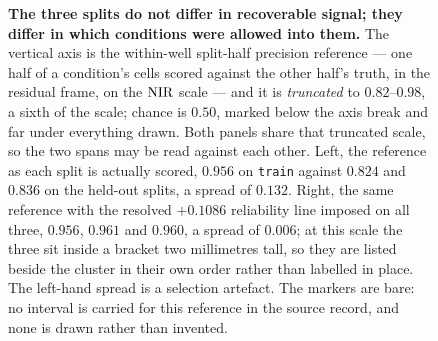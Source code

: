 \begin{figure}[htbp]
\caption[The split references, before and after matching]{\textbf{The three
splits do not differ in recoverable signal; they differ in which conditions were
allowed into them.} The vertical axis is the within-well split-half precision
reference --- one half of a condition's cells scored against the other half's
truth, in the residual frame, on the $\textrm{NIR}$ scale --- and it is
\emph{truncated} to $0.82$--$0.98$, a sixth of the scale; chance is $0.50$,
marked below the axis break and far under everything drawn. Both panels share
that truncated scale, so the two spans may be read against each other. Left,
the reference as each split is actually scored, $0.956$ on \texttt{train}
against $0.824$ and $0.836$ on the held-out splits, a spread of $0.132$. Right,
the same reference with the resolved $+0.1086$ reliability line imposed on all
three, $0.956$, $0.961$ and $0.960$, a spread of $0.006$; at this scale the
three sit inside a bracket two millimetres tall, so they are listed beside the
cluster in
their own order rather than labelled in place. The left-hand spread is a
selection artefact. The markers are bare: no interval is carried for this
reference in the source record, and none is drawn rather than invented.}
\label{fig:splitref}
\end{figure}
